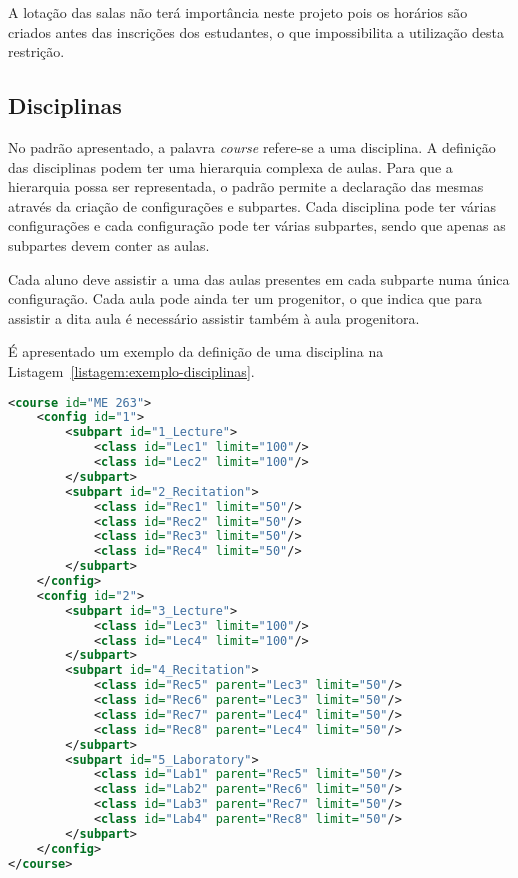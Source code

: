A lotação das salas não terá importância neste projeto pois os horários são criados antes das inscrições dos estudantes, o que impossibilita a utilização desta restrição.

\subsection{Disciplinas}

No padrão apresentado, a palavra \textit{course} refere-se a uma disciplina. A definição das disciplinas podem ter uma hierarquia complexa de aulas. Para que a hierarquia possa ser representada, o padrão permite a declaração das mesmas através da criação de configurações e subpartes. Cada disciplina pode ter várias configurações e cada configuração pode ter várias subpartes, sendo que apenas as subpartes devem conter as aulas.

Cada aluno deve assistir a uma das aulas presentes em cada subparte numa única configuração. Cada aula pode ainda ter um progenitor, o que indica que para assistir a dita aula é necessário assistir também à aula progenitora.

É apresentado um exemplo da definição de uma disciplina na Listagem~\ref{listagem:exemplo-disciplinas}.

\begin{lstlisting}[language=XML, float, caption={Exemplo da definição de uma disciplina.}, label={listagem:exemplo-disciplinas}]
<course id="ME 263">
    <config id="1">
        <subpart id="1_Lecture">
            <class id="Lec1" limit="100"/>
            <class id="Lec2" limit="100"/>
        </subpart>
        <subpart id="2_Recitation">
            <class id="Rec1" limit="50"/>
            <class id="Rec2" limit="50"/>
            <class id="Rec3" limit="50"/>
            <class id="Rec4" limit="50"/>
        </subpart>
    </config>
    <config id="2">
        <subpart id="3_Lecture">
            <class id="Lec3" limit="100"/>
            <class id="Lec4" limit="100"/>
        </subpart>
        <subpart id="4_Recitation">
            <class id="Rec5" parent="Lec3" limit="50"/>
            <class id="Rec6" parent="Lec3" limit="50"/>
            <class id="Rec7" parent="Lec4" limit="50"/>
            <class id="Rec8" parent="Lec4" limit="50"/>
        </subpart>
        <subpart id="5_Laboratory">
            <class id="Lab1" parent="Rec5" limit="50"/>
            <class id="Lab2" parent="Rec6" limit="50"/>
            <class id="Lab3" parent="Rec7" limit="50"/>
            <class id="Lab4" parent="Rec8" limit="50"/>
        </subpart>
    </config>
</course>
\end{lstlisting}

